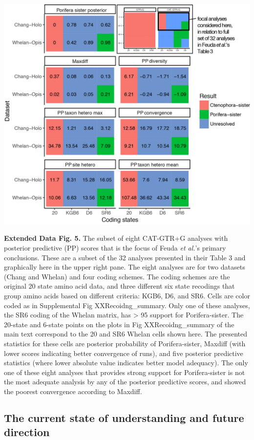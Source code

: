 \documentclass[]{article}
\begin{document}
\includegraphics{figures/Figure_recoding_pp.png}

\textbf{Extended Data Fig. 5.} The subset of eight CAT-GTR+G analyses
with posterior predictive (PP) scores that is the focus of Feuda
\emph{et al.}'s primary conclusions. These are a subset of the 32
analyses presented in their Table 3 and graphically here in the upper
right pane. The eight analyses are for two datasets (Chang and Whelan)
and four coding schemes. The coding schemes are the original 20 state
amino acid data, and three different six state recodings that group
amino acids based on different criteria: KGB6, D6, and SR6. Cells are
color coded as in Supplemental Fig XXRecoidng\_summary. Only one of
these analyses, the SR6 coding of the Whelan matrix, has \textgreater{}
95 support for Porifera-sister. The 20-state and 6-state points on the
plots in Fig XXRecoidng\_summary of the main text correspond to the 20
and SR6 Whelan cells shown here. The presented statistics for these
cells are posterior probability of Porifera-sister, Maxdiff (with lower
scores indicating better convergence of runs), and five posterior
predictive statistics (where lower absolute value indicates better model
adequacy). The only one of these eight analyses that provides strong
support for Porifera-sister is not the most adequate analysis by any of
the posterior predictive scores, and showed the poorest convergence
according to Maxdiff.

\hypertarget{the-current-state-of-understanding-and-future-direction}{%
\subsection{The current state of understanding and future
direction}\label{the-current-state-of-understanding-and-future-direction}}
\end{document}
